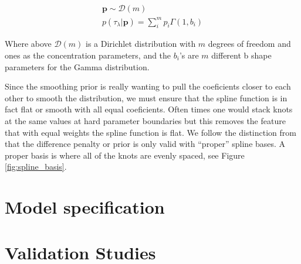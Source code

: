 \begin{align}
    \bm{p} \sim \mathcal{D}(m) \\
    p(\tau_\lambda | \bm{p}) = \sum_i^m p_i \Gamma(1, b_i)
\end{align}

\noindent Where above $\mathcal{D}(m)$ is a Dirichlet distribution with $m$ degrees of freedom and ones as the concentration parameters, 
and the $b_i$'s are $m$ different b shape parameters for the Gamma distribution.




Since the smoothing prior is really wanting to pull the coeficients closer to each other to smooth the distribution, 
we must ensure that the spline function is in fact flat or smooth with all equal coeficients. Often times one would stack knots at the same values 
at hard parameter boundaries but this removes the feature that with equal weights the spline function is flat. We follow the distinction from  
that the difference penalty or prior is only valid with ``proper'' spline bases. A proper basis is where all of the knots are evenly spaced, see Figure \ref{fig:spline_basis}.

\section{Model specification} \label{sec:modelpriors}

\section{Validation Studies} \label{sec:validation}

